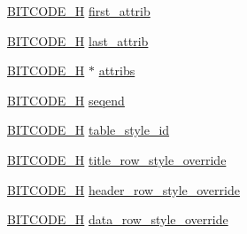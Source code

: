 \begin{DoxyCompactItemize}
\item 
\hyperlink{dwg_8h_a7c700e94e047a97ba8c24bdfe4029dc3}{\-B\-I\-T\-C\-O\-D\-E\-\_\-\-H} \hyperlink{struct__dwg__entity__TABLE_ab9782a05e87d5cafeb48688762a8c64f}{first\-\_\-attrib}
\item 
\hyperlink{dwg_8h_a7c700e94e047a97ba8c24bdfe4029dc3}{\-B\-I\-T\-C\-O\-D\-E\-\_\-\-H} \hyperlink{struct__dwg__entity__TABLE_a7bf2d1a5618d05f6b15f3db7b54581ef}{last\-\_\-attrib}
\item 
\hyperlink{dwg_8h_a7c700e94e047a97ba8c24bdfe4029dc3}{\-B\-I\-T\-C\-O\-D\-E\-\_\-\-H} $\ast$ \hyperlink{struct__dwg__entity__TABLE_a21c18d58a18343b8c76899ce73709b50}{attribs}
\item 
\hyperlink{dwg_8h_a7c700e94e047a97ba8c24bdfe4029dc3}{\-B\-I\-T\-C\-O\-D\-E\-\_\-\-H} \hyperlink{struct__dwg__entity__TABLE_af1f21a7fc28eefa9bbc6106530334ab3}{seqend}
\item 
\hyperlink{dwg_8h_a7c700e94e047a97ba8c24bdfe4029dc3}{\-B\-I\-T\-C\-O\-D\-E\-\_\-\-H} \hyperlink{struct__dwg__entity__TABLE_a5d738415ae3bb3efc4c1f3dc77ecdc8a}{table\-\_\-style\-\_\-id}
\item 
\hyperlink{dwg_8h_a7c700e94e047a97ba8c24bdfe4029dc3}{\-B\-I\-T\-C\-O\-D\-E\-\_\-\-H} \hyperlink{struct__dwg__entity__TABLE_aa2e848045b68b4cec5131b091c2ea83f}{title\-\_\-row\-\_\-style\-\_\-override}
\item 
\hyperlink{dwg_8h_a7c700e94e047a97ba8c24bdfe4029dc3}{\-B\-I\-T\-C\-O\-D\-E\-\_\-\-H} \hyperlink{struct__dwg__entity__TABLE_a6dfc12670dfe17ba586bbafd1e1403ba}{header\-\_\-row\-\_\-style\-\_\-override}
\item 
\hyperlink{dwg_8h_a7c700e94e047a97ba8c24bdfe4029dc3}{\-B\-I\-T\-C\-O\-D\-E\-\_\-\-H} \hyperlink{struct__dwg__entity__TABLE_ad4997beaecc630ba74a1e8a4bb94a974}{data\-\_\-row\-\_\-style\-\_\-override}
\end{DoxyCompactItemize}



